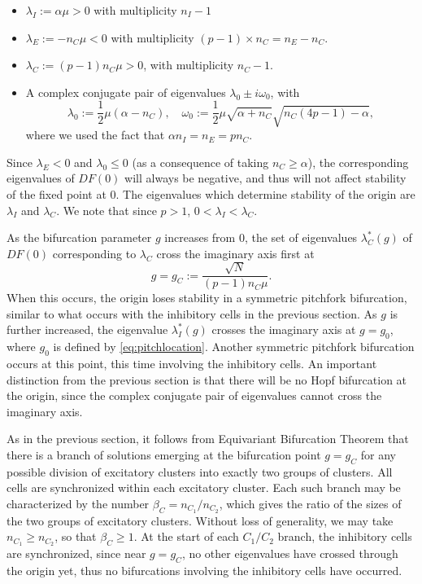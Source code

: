 \documentclass[reqno]{siamonline190516}
\begin{document}
\begin{itemize}
\item $\lambda_I := \alpha \mu > 0$ with multiplicity $n_I - 1$
\item $\lambda_E := -n_C \mu < 0$ with multiplicity $(p-1) \times n_C = n_E - n_C$.
\item $\lambda_C := (p-1) n_C \mu > 0$, with multiplicity $n_C - 1$.
\item A complex conjugate pair of eigenvalues $\lambda_0 \pm i \omega_0$, with 
\begin{equation*}
    \lambda_0 := \frac{1}{2}\mu(\alpha - n_C), \quad 
    \omega_0 := \frac{1}{2}\mu \sqrt{ \alpha + n_C} \sqrt{ n_C(4 p - 1) - \alpha },
\end{equation*}
where we used the fact that $\alpha n_I = n_E = p n_C$.
\end{itemize}
Since $\lambda_E < 0$ and $\lambda_0 \leq 0$ (as a consequence of taking $n_C \geq \alpha$), the corresponding eigenvalues of $DF(0)$ will always be negative, and thus will not affect stability of the fixed point at 0. The eigenvalues which determine stability of the origin are $\lambda_I$ and $\lambda_C$. We note that since $p > 1$, $0 < \lambda_I < \lambda_C$.

As the bifurcation parameter $g$ increases from 0, the set of eigenvalues $\lambda_C^*(g)$ of $DF(0)$ corresponding to $\lambda_C$ cross the imaginary axis first at 
\begin{equation}
    g = g_C := \frac{\sqrt{N}}{(p-1) n_C \mu}.
\end{equation}
When this occurs, the origin loses stability in a symmetric pitchfork bifurcation, similar to what occurs with the inhibitory cells in the previous section. As $g$ is further increased, the eigenvalue $\lambda_I^*(g)$ crosses the imaginary axis at $g = g_0$, where $g_0$ is defined by \cref{eq:pitchlocation}. Another symmetric pitchfork bifurcation occurs at this point, this time involving the inhibitory cells. An important distinction from the previous section is that there will be no Hopf bifurcation at the origin, since the complex conjugate pair of eigenvalues cannot cross the imaginary axis.

As in the previous section, it follows from Equivariant Bifurcation Theorem that there is a branch of solutions emerging at the bifurcation point $g = g_C$ for any possible division of excitatory clusters into exactly two groups of clusters. All cells are synchronized within each excitatory cluster. Each such branch may be characterized by the number $\beta_C = n_{C_1}/n_{C_2}$, which gives the ratio of the sizes of the two groups of excitatory clusters. Without loss of generality, we may take $n_{C_1} \geq n_{C_2}$, so that $\beta_C \geq 1$. At the start of each $C_1/C_2$ branch, the inhibitory cells are synchronized, since near $g = g_C$, no other eigenvalues have crossed through the origin yet, thus no bifurcations involving the inhibitory cells have occurred.
\end{document}
